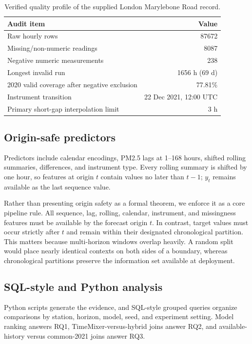 \documentclass[sn-mathphys-num]{sn-jnl}
\begin{document}
\begin{table}[tbp]
\centering
\caption{Verified quality profile of the supplied London Marylebone Road record.}
\label{tab:dataaudit}
\small
\begin{tabular}{lr}
\toprule
Audit item & Value \\
\midrule
Raw hourly rows & \num{87672} \\
Missing/non-numeric readings & \num{8087} \\
Negative numeric measurements & \num{238} \\
Longest invalid run & \num{1656} h (69 d) \\
2020 valid coverage after negative exclusion & 77.81\% \\
Instrument transition & 22 Dec 2021, 12:00 UTC \\
Primary short-gap interpolation limit & 3 h \\
\bottomrule
\end{tabular}
\end{table}

\subsection{Origin-safe predictors}
\label{sec:originsafe}

Predictors include calendar encodings, PM2.5 lags at 1--168 hours, shifted
rolling summaries, differences, and instrument type. Every rolling summary is
shifted by one hour, so features at origin \(t\) contain values no later than
\(t-1\); \(y_t\) remains available as the last sequence value.

Rather than presenting origin safety as a formal theorem, we enforce it as a core pipeline rule. All sequence, lag, rolling, calendar, instrument, and missingness features must be available by the forecast origin \(t\). In contrast, target values must occur strictly after \(t\) and remain within their designated chronological partition.
 This matters because multi-horizon windows
overlap heavily. A random split would place nearly identical contexts on both
sides of a boundary, whereas chronological partitions preserve the information
set available at deployment.

\subsection{SQL-style and Python analysis}
\label{sec:query-analysis}

Python scripts generate the evidence, and SQL-style grouped queries organize
comparisons by station, horizon, model, seed, and experiment setting. Model
ranking answers RQ1, TimeMixer-versus-hybrid joins answer RQ2, and
available-history versus common-2021 joins answer RQ3.
\end{document}
